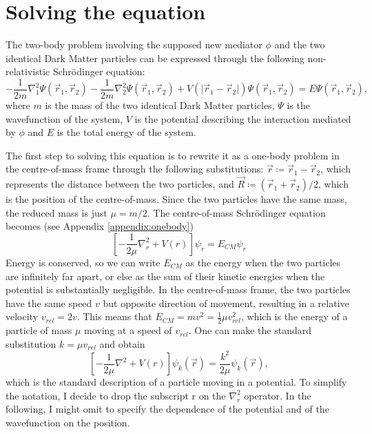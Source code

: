 \chapter{Solving the equation}\label{chap:derivation}
The two-body problem involving the supposed new mediator \(\phi \) and the two identical Dark Matter particles can be expressed through the following non-relativistic Schrödinger equation:
\begin{equation}\label{eq:initial_equation}
	-\frac{1}{2m} \nabla_1 ^2 \Psi(\vec{r}_1,\vec{r}_2)  - \frac{1}{2m} \nabla_2 ^2 \Psi(\vec{r}_1,\vec{r}_2)  + V(\vert \vec{r}_1 - \vec{r}_2 \vert ) \Psi(\vec{r}_1,\vec{r}_2) =E \Psi (\vec{r}_1,\vec{r}_2),
\end{equation}
where \(m\) is the mass of the two identical Dark Matter particles, \(\Psi\) is the wavefunction of the system, \(V\) is the potential describing the interaction mediated by \(\phi \) and \(E\) is the total energy of the system.

The first step to solving this equation is to rewrite it as a one-body problem in the centre-of-mass frame through the following substitutions: \(\vec{r} \coloneqq  \vec{r}_1 - \vec{r}_2\), which represents the distance between the two particles, and \(\vec{R} \coloneqq (\vec{r}_1 + \vec{r}_2) / 2\), which is the position of the centre-of-mass. Since the two particles have the same mass, the reduced mass is just \(\mu = m / 2\). The centre-of-mass Schrödinger equation becomes (see Appendix \ref{appendix:onebody})
\begin{equation}
	\left[- \frac{1}{2\mu }\nabla _r^2 + V(r)\right]\psi _r = E_{CM} \psi _r
\end{equation}
Energy is conserved, so we can write \(E_{CM} \) as the energy when the two particles are infinitely far apart, or else as the sum of their kinetic energies when the potential is substantially negligible. In the centre-of-mass frame, the two particles have the same speed \(v\) but opposite direction of movement, resulting in a relative velocity \(v_{rel} = 2v\). This means that \(E_{CM} = mv^2 = \frac{1}{2} \mu v_{rel}^2\), which is the energy of a particle of mass \(\mu \) moving at a speed of \(v_{rel} \). One can make the standard substitution \(k=\mu v_{rel} \) and obtain
\begin{equation}
	\left[- \frac{1}{2\mu } \nabla ^2 + V(r)\right] \psi _k (\vec{r}) = \frac{k^2}{2\mu } \psi _k (\vec{r}),
\end{equation}
which is the standard description of a particle moving in a potential. To simplify the notation, I decide to drop the subscript r on the \(\nabla _r ^2\) operator. In the following, I might omit to specify the dependence of the potential and of the wavefunction on the position.

